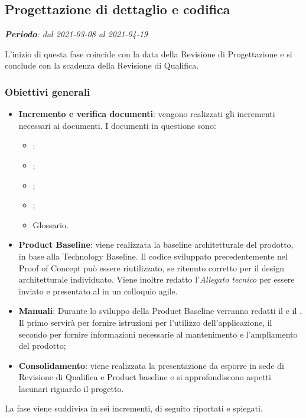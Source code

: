 \subsection{Progettazione di dettaglio e codifica}
\textit{\textbf{Periodo}: dal 2021-03-08 al 2021-04-19}

L'inizio di questa fase coincide con la data della Revisione di Progettazione e si conclude con la scadenza della Revisione di Qualifica.

\subsubsection{Obiettivi generali}

\begin{itemize}
\item \textbf{Incremento e verifica documenti}: vengono realizzati gli incrementi necessari ai documenti. I documenti in questione sono:
\begin{itemize}
\item \NdP{};
\item \AdR{};
\item \PdQ{};
\item \PdP{};
\item Glossario.
\end{itemize}
\item \textbf{Product Baseline}: viene realizzata la baseline architetturale del prodotto, in base alla Technology Baseline. Il codice sviluppato precedentemente nel Proof of Concept può essere riutilizzato, se ritenuto corretto per il design architetturale individuato. Viene inoltre redatto l'\textit{Allegato tecnico} per essere inviato e presentato al \CR{} in un colloquio agile.\\
\item \textbf{Manuali}: Durante lo sviluppo della Product Baseline verranno redatti il \MU{} e il \MM. Il primo servirà per fornire istruzioni per l'utilizzo dell'applicazione, il secondo per fornire informazioni necessarie al mantenimento e l'ampliamento del prodotto;
\item \textbf{Consolidamento}: viene realizzata la presentazione da esporre in sede di Revisione di Qualifica e Product baseline e si approfondiscono aspetti lacunari riguardo il progetto.
\end{itemize}

La fase viene suddivisa in sei incrementi, di seguito riportati e spiegati.


\newpage

\newpage

\newpage

\newpage

\newpage

\newpage

